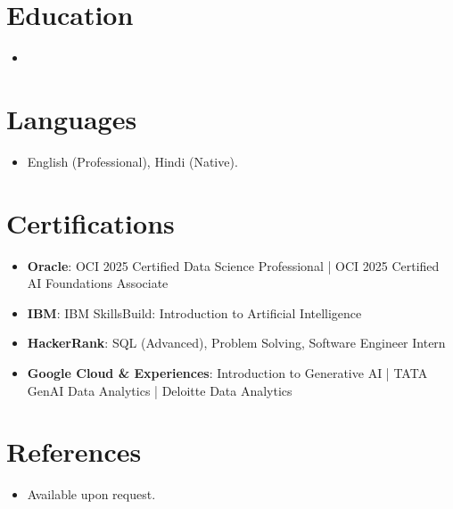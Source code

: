 \documentclass[11pt,a4paper,sans]{moderncv}
\begin{document}

\section{Education}
\vspace{1pt}
\begin{itemize}

\item{}

\end{itemize}


\section{Languages}
\vspace{1pt}
\begin{itemize}
\item English (Professional), Hindi (Native).
\end{itemize}


\section{Certifications}
\vspace{1pt}
\begin{itemize}
\item \textbf{Oracle}: OCI 2025 Certified Data Science Professional | OCI 2025 Certified AI Foundations Associate
\item \textbf{IBM}: IBM SkillsBuild: Introduction to Artificial Intelligence
\item \textbf{HackerRank}: SQL (Advanced), Problem Solving, Software Engineer Intern
\item \textbf{Google Cloud \& Experiences}: Introduction to Generative AI | TATA GenAI Data Analytics | Deloitte Data Analytics
\end{itemize}


\section{References}
\vspace{1pt}
\begin{itemize}
\item Available upon request.
\end{itemize}
\end{document}
